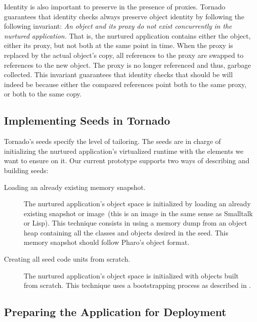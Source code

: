 Identity is also important to preserve in the presence of proxies. Tornado guarantees that identity checks always preserve object identity by following the following invariant: \emph{An object and its proxy do not exist concurrently in the nurtured application.} That is, the nurtured application contains either the object, either its proxy, but not both at the same point in time. When the proxy is replaced by the actual object's copy, all references to the proxy are swapped to references to the new object. The proxy is no longer referenced and thus, garbage collected. This invariant guarantees that identity checks that should be  will indeed be  because either the compared references point both to the same proxy, or both to the same copy.

\subsection{Implementing Seeds in Tornado}

Tornado's seeds specify the level of tailoring. The seeds are in charge of initializing the nurtured application's virtualized runtime with the elements we want to ensure on it. Our current prototype supports two ways of describing and building seeds: 

\begin{description}
\item[Loading an already existing memory snapshot.] The nurtured application's object space is initialized by loading an already existing snapshot or image~(\ie this is an image in the same sense as Smalltalk or Lisp). This technique consists in using a memory dump from an object heap containing all the classes and objects desired in the seed. This memory snapshot should follow Pharo's object format. 
\item[Creating all seed code units from scratch.] The nurtured application's object space is initialized with objects built from scratch. This technique uses a bootstrapping process as described in .
\end{description}


\subsection{Preparing the Application for Deployment}\label{sec:deploy}

